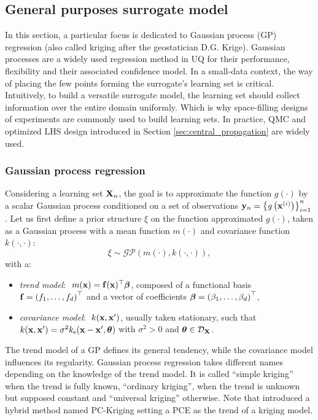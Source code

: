 \subsection{General purposes surrogate model}

In this section, a particular focus is dedicated to Gaussian process (GP) regression (also called kriging after the geostatician D.G. Krige). 
Gaussian processes are a widely used regression method in UQ for their performance, flexibility and their associated confidence model. 
In a small-data context, the way of placing the few points forming the surrogate's learning set is critical. 
Intuitively, to build a versatile surrogate model, the learning set should collect information over the entire domain uniformly. 
Which is why space-filling designs of experiments are commonly used to build learning sets. 
In practice, QMC and optimized LHS design introduced in Section \ref{sec:central_propagation} are widely used.  

\subsubsection{Gaussian process regression}

Considering a learning set ${\bf X}_n$, the goal is to approximate the function $g(\cdot)$ by a scalar Gaussian process conditioned on a set of observations ${\bf y}_n = \left\{g\left({\bf x}^{(i)}\right)\right\}_{i=1}^n$. 
Let us first define a prior structure $\xi$ on the function approximated $g(\cdot)$, taken as a Gaussian process with a mean function $m(\cdot)$ and covariance function $k(\cdot, \cdot)$:  
\begin{equation}
    \xi \sim \mathcal{GP}(m(\cdot), k(\cdot, \cdot)),
\end{equation} 
with a: 
\begin{itemize}
    \item \textit{trend model}: $~m({\bf x}) = \mathbf{f}({\bf x})^\top {\boldsymbol{\beta}}$, composed of a functional basis $\mathbf{f} = \left(f_1, \dots, f_d\right)^\top$ and a vector of coefficients 
    ${\boldsymbol{\beta}} = \left(\beta_1, \dots, \beta_d\right)^\top$,
    \item \textit{covariance model}: $~k({\bf x}, {\bf x}')$, usually taken stationary, such that $k({\bf x}, {\bf x}') = \sigma^2 k_{\mathrm{s}}({\bf x} - {\bf x}', {\boldsymbol{\theta}})$ with $\sigma^2>0$ and ${\boldsymbol{\theta}} \in \mathcal{D}_{\bf X}$.
\end{itemize}
The trend model of a GP defines its general tendency, while the covariance model influences its regularity. 
Gaussian process regression takes different names depending on the knowledge of the trend model. 
It is called ``simple kriging'' when the trend is fully known, ``ordinary kriging'', when the trend is unknown but supposed constant and ``universal kriging'' otherwise. 
Note that \cite{schobi_2015} introduced a hybrid method named PC-Kriging setting a PCE as the trend of a kriging model. %

